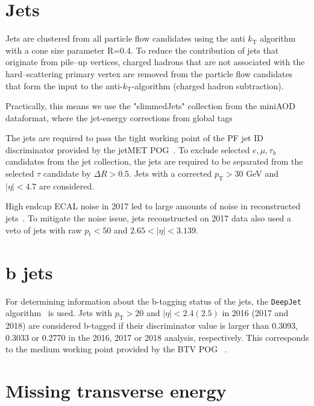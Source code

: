 \section{Jets}

Jets are clustered from all particle flow 
candidates using the anti $k_{\text{T}}$ algorithm~\cite{Cacciari:2011ma} with a cone size parameter R=0.4. To reduce the contribution of jets that originate from 
pile--up vertices, charged hadrons that are not associated with the hard--scattering primary vertex are removed from the particle flow candidates 
that form the input to the anti-$k_{\text{T}}$-algorithm (charged hadron subtraction).

Practically, this means we use the "slimmedJets" collection from the miniAOD dataformat, 
where the jet-energy corrections from global tags

The jets are required to pass the tight working point of
the PF jet ID discriminator provided by the jetMET POG~\cite{PFJetID}.  
To exclude selected $e,\mu,\tau_{h}$ candidates from the jet collection, the jets
are required to be separated from the selected $\tau$ candidate by $\Delta R
> 0.5$.  Jets with a corrected $p_{\text{T}} > 30$ GeV and $|\eta|<4.7$ are
considered.

High endcap ECAL noise in 2017 led to large amounts of noise in reconstructed jets~\cite{JetTwiki}. To mitigate the noise issue,
jets reconstructed on 2017 data also used a veto of jets with
raw $p_{t} < 50$ and $2.65 < |\eta| < 3.139$. 

\section{b jets}

For determining information about the b-tagging status of the jets, the
\texttt{DeepJet} algorithm~\cite{DeepFlavour} is used.  Jets with $p_{\text{T}} > 20$ and $|\eta| < 2.4 (2.5)$ in 2016 (2017 and 2018) are considered
b-tagged if their discriminator value is larger than 0.3093, 0.3033 or 
0.2770 in the 2016, 2017 or 2018 analysis, respectively. This
corresponds to the medium working point provided by the BTV POG
~\cite{BTVPOG_2016,BTVPOG_2017,BTVPOG_2018}.

\section{Missing transverse energy}

